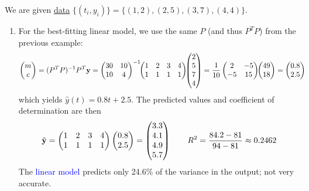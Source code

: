\begin{example}{}{}
	We are given \href{http://math.uci.edu/~ndonalds/math8/poly-ex.xlsx}{data} $\{(t_i,y_i)\}=\{(1,2),(2,5),(3,7),(4,4)\}$.
	\begin{enumerate}
	  \item For the best-fitting linear model, we use the same $P$ (and thus $P^TP$) from the previous example:
	  \begin{align*}
	  	\begin{pmatrix}m\\c\end{pmatrix}&=(P^TP)^{-1}P^T{\mathbf{y}}=
	  	\begin{pmatrix}
				30&10\\
				10&4
			\end{pmatrix}^{-1}
			\!\!
			\begin{pmatrix}
				1&2&3&4\\
				1&1&1&1
			\end{pmatrix}
			\!\!\begin{pmatrix}2\\5\\7\\4\end{pmatrix} =\frac 1{10}
			\begin{pmatrix}
				2&-5\\
				-5&15
			\end{pmatrix}
			\!\!\begin{pmatrix}49\\18\end{pmatrix} =\begin{pmatrix}0.8\\2.5\end{pmatrix}
		\end{align*}
		which yields $\hat y(t)=0.8t+2.5$. The predicted values and coefficient of determination are then
		\[
			\hat{{\mathbf{y}}}=
			\begin{pmatrix}
				1&2&3&4\\
				1&1&1&1
			\end{pmatrix}
			\begin{pmatrix}0.8\\2.5\end{pmatrix}=\begin{pmatrix}3.3\\4.1\\4.9\\5.7\end{pmatrix}\qquad R^2=\frac{84.2-81}{94-81}\approx 0.2462
		\]
		The \textcolor{blue}{linear model} predicts only 24.6\% of the variance in the output; not very accurate.
		

\end{enumerate}
\end{example}

